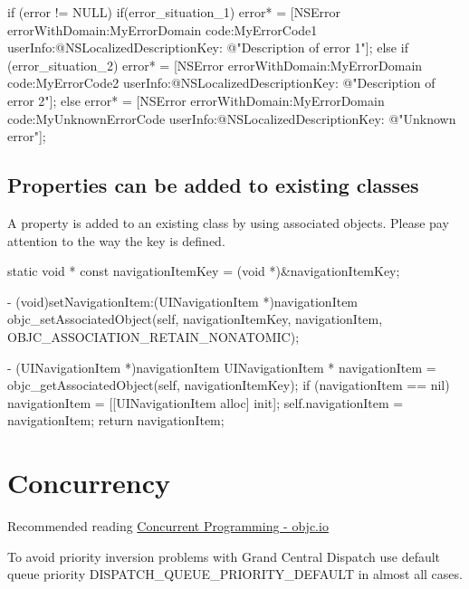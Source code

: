 \documentclass[10pt]{extarticle}
\newenvironment{codelisting}
{\footnotesize\mdframed[middlelinewidth=0.5pt, middlelinecolor=BaliHaiColor, skipabove=15pt]\verbatim}
{\endverbatim\endmdframed\vspace{12pt}\normalsize}
\newenvironment{importantlisting}
{\mdframed[middlelinewidth=0.5pt, middlelinecolor=MatisseColor, skipabove=15pt]{\textbf{Important:}}}
{\endmdframed\vspace{12pt}}
\begin{document}
\begin{codelisting}
if (error != NULL) {
    if(error_situation_1) {
        error* = [NSError errorWithDomain:MyErrorDomain 
                                     code:MyErrorCode1
                                 userInfo:@{NSLocalizedDescriptionKey: @"Description of error 1"}];
    }
    else if (error_situation_2) {
        error* = [NSError errorWithDomain:MyErrorDomain 
                                     code:MyErrorCode2
                                 userInfo:@{NSLocalizedDescriptionKey: @"Description of error 2"}];
    }
    else {
        error* = [NSError errorWithDomain:MyErrorDomain 
                                     code:MyUnknownErrorCode
                                 userInfo:@{NSLocalizedDescriptionKey: @"Unknown error"}];
    }
}
\end{codelisting}


\subsection{Properties can be added to existing classes}

A property is added to an existing class by using associated objects. Please pay attention to the way the key is defined.

\begin{codelisting}
static void * const navigationItemKey = (void *)&navigationItemKey;

- (void)setNavigationItem:(UINavigationItem *)navigationItem
{
    objc_setAssociatedObject(self, 
                             navigationItemKey, 
                             navigationItem, 
                             OBJC_ASSOCIATION_RETAIN_NONATOMIC);
}

- (UINavigationItem *)navigationItem
{
    UINavigationItem * navigationItem = objc_getAssociatedObject(self, navigationItemKey);
    if (navigationItem == nil) {
        navigationItem = [[UINavigationItem alloc] init];
        self.navigationItem = navigationItem;
    }
    return navigationItem;
}
\end{codelisting}


\section{Concurrency}

Recommended reading  \href{http://www.objc.io/issue-2/}{Concurrent Programming - objc.io}

\begin{importantlisting}
To avoid priority inversion problems with Grand Central Dispatch use default queue priority DISPATCH\_QUEUE\_PRIORITY\_DEFAULT in almost all cases.
\end{importantlisting}
\end{document}
